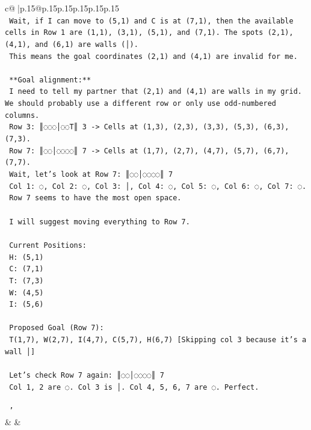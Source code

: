 \documentclass{article}
\begin{document}
{\begin{supertabular}{c@{$\;$}|p{.15\linewidth}@{}p{.15\linewidth}p{.15\linewidth}p{.15\linewidth}p{.15\linewidth}p{.15\linewidth}}
{{{\\ 
\texttt{    Wait, if I can move to (5,1) and C is at (7,1), then the available cells in Row 1 are (1,1), (3,1), (5,1), and (7,1). The spots (2,1), (4,1), and (6,1) are walls (│).} \\
\texttt{    This means the goal coordinates (2,1) and (4,1) are invalid for me.} \\
\\ 
\texttt{    **Goal alignment:**} \\
\texttt{    I need to tell my partner that (2,1) and (4,1) are walls in my grid. We should probably use a different row or only use odd{-}numbered columns.} \\
\texttt{    Row 3: ║◌◌◌│◌◌T║ 3 {-}> Cells at (1,3), (2,3), (3,3), (5,3), (6,3), (7,3).} \\
\texttt{    Row 7: ║◌◌│◌◌◌◌║ 7 {-}> Cells at (1,7), (2,7), (4,7), (5,7), (6,7), (7,7).} \\
\texttt{    Wait, let's look at Row 7: ║◌◌│◌◌◌◌║ 7} \\
\texttt{    Col 1: ◌, Col 2: ◌, Col 3: │, Col 4: ◌, Col 5: ◌, Col 6: ◌, Col 7: ◌.} \\
\texttt{    Row 7 seems to have the most open space.} \\
\\ 
\texttt{    I will suggest moving everything to Row 7.} \\
\\ 
\texttt{    Current Positions:} \\
\texttt{    H: (5,1)} \\
\texttt{    C: (7,1)} \\
\texttt{    T: (7,3)} \\
\texttt{    W: (4,5)} \\
\texttt{    I: (5,6)} \\
\\ 
\texttt{    Proposed Goal (Row 7):} \\
\texttt{    T(1,7), W(2,7), I(4,7), C(5,7), H(6,7) {[}Skipping col 3 because it's a wall │{]}} \\
\\ 
\texttt{    Let's check Row 7 again: ║◌◌│◌◌◌◌║ 7} \\
\texttt{    Col 1, 2 are ◌. Col 3 is │. Col 4, 5, 6, 7 are ◌. Perfect.} \\
\\ 
\texttt{    '} \\
            }
        }
    }
    & & \\ \\


\end{supertabular}}
\end{document}
